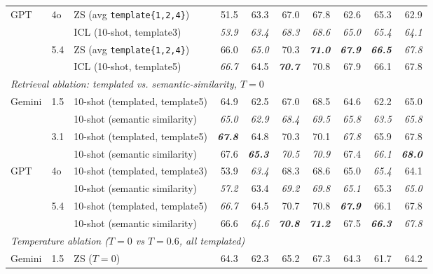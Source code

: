 \begin{table}[t]
\begin{tabular}{lllrrrrrrr}
\multirow{4}{*}{GPT} & \multirow{2}{*}{4o} & ZS (avg \texttt{template\{1,2,4\}}) & 51.5 & 63.3 & 67.0 & 67.8 & 62.6 & 65.3 & 62.9 \\
 &  & ICL (10-shot, template3) & \emph{53.9} & \emph{63.4} & \emph{68.3} & \emph{68.6} & \emph{65.0} & \emph{65.4} & \emph{64.1} \\
\cmidrule(lr){2-10}
 & \multirow{2}{*}{5.4} & ZS (avg \texttt{template\{1,2,4\}}) & 66.0 & \emph{65.0} & 70.3 & \textbf{\emph{71.0}} & \textbf{\emph{67.9}} & \textbf{\emph{66.5}} & \emph{67.8} \\
 &  & ICL (10-shot, template5) & \emph{66.7} & 64.5 & \textbf{\emph{70.7}} & 70.8 & 67.9 & 66.1 & 67.8 \\
\midrule\midrule
\multicolumn{10}{l}{\textit{Retrieval ablation: templated vs. semantic-similarity, $T{=}0$}} \\
\midrule
\multirow{4}{*}{Gemini} & \multirow{2}{*}{1.5} & 10-shot (templated, template5) & 64.9 & 62.5 & 67.0 & 68.5 & 64.6 & 62.2 & 65.0 \\
 &  & 10-shot (semantic similarity) & \emph{65.0} & \emph{62.9} & \emph{68.4} & \emph{69.5} & \emph{65.8} & \emph{63.5} & \emph{65.8} \\
\cmidrule(lr){2-10}
 & \multirow{2}{*}{3.1} & 10-shot (templated, template5) & \textbf{\emph{67.8}} & 64.8 & 70.3 & 70.1 & \emph{67.8} & 65.9 & 67.8 \\
 &  & 10-shot (semantic similarity) & 67.6 & \textbf{\emph{65.3}} & \emph{70.5} & \emph{70.9} & 67.4 & \emph{66.1} & \textbf{\emph{68.0}} \\
\cmidrule(lr){1-10}
\multirow{4}{*}{GPT} & \multirow{2}{*}{4o} & 10-shot (templated, template3) & 53.9 & \emph{63.4} & 68.3 & 68.6 & 65.0 & \emph{65.4} & 64.1 \\
 &  & 10-shot (semantic similarity) & \emph{57.2} & 63.4 & \emph{69.2} & \emph{69.8} & \emph{65.1} & 65.3 & \emph{65.0} \\
\cmidrule(lr){2-10}
 & \multirow{2}{*}{5.4} & 10-shot (templated, template5) & \emph{66.7} & 64.5 & 70.7 & 70.8 & \textbf{\emph{67.9}} & 66.1 & 67.8 \\
 &  & 10-shot (semantic similarity) & 66.6 & \emph{64.6} & \textbf{\emph{70.8}} & \textbf{\emph{71.2}} & 67.5 & \textbf{\emph{66.3}} & \emph{67.8} \\
\midrule\midrule
\multicolumn{10}{l}{\textit{Temperature ablation ($T{=}0$ vs $T{=}0.6$, all templated)}} \\
\midrule
\multirow{8}{*}{Gemini} & \multirow{4}{*}{1.5} & ZS ($T{=}0$) & 64.3 & 62.3 & 65.2 & 67.3 & 64.3 & 61.7 & 64.2 \\

\end{tabular}
\end{table}

